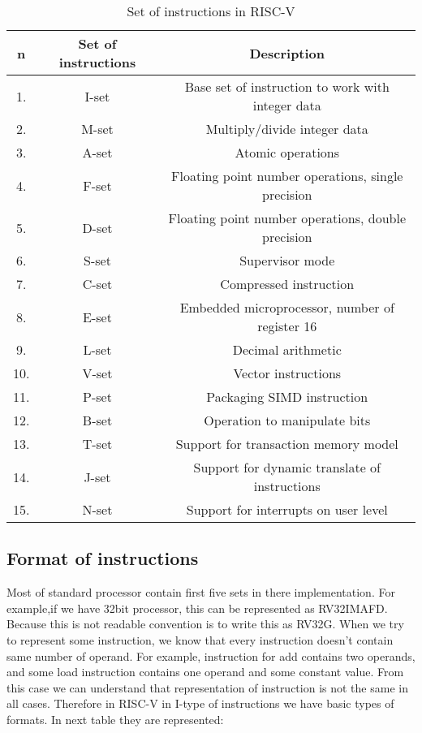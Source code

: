 \documentclass{scrreprt}
\begin{document}
    \begin{table}[htb!]
        \centering
        \begin{tabular}{|c|c|c|} \hline 
             n & Set of instructions & Description \\ \hline 
             1. &  I-set & Base set of instruction to work with integer data \\ \hline 
             2. &  M-set & Multiply/divide integer data \\ \hline 
             3. &  A-set &  Atomic operations \\ \hline 
             4. &  F-set &   Floating point number operations, single precision\\ \hline 
             5. &  D-set &  Floating point number operations, double precision\\ \hline 
             6. &  S-set &  Supervisor mode\\ \hline 
             7. &  C-set &  Compressed instruction \\ \hline 
             8. &  E-set &  Embedded microprocessor, number of register 16 \\\hline 
             9. &  L-set &   Decimal arithmetic \\ \hline 
             10. &  V-set &  Vector instructions \\ \hline 
             11. &  P-set &  Packaging SIMD instruction\\ \hline 
             12. &  B-set &  Operation to manipulate bits \\ \hline 
             13. &  T-set &  Support for transaction memory model \\\hline 
             14. &  J-set &  Support for dynamic translate of instructions \\ \hline 
             15. &  N-set &  Support for interrupts on user level  \\\hline 
             
        \end{tabular}
        \caption{Set of instructions in RISC-V}
        \label{tab:table1}
    \end{table}
    \newpage
    \subsection*{Format of instructions}
        Most of standard processor contain first five sets in there implementation. For example,if we have 32bit processor, this can be represented as RV32IMAFD. Because this is not readable convention is to write this as RV32G. 
        When we try to represent some instruction, we know that every instruction doesn't contain same number of operand. For example, instruction for add contains two operands, and some load instruction contains one operand and some constant value. From this case we can understand that representation of instruction is not the same in all cases. Therefore in RISC-V in I-type of instructions we have basic types of formats. In next table they are represented:
    
\end{document}

